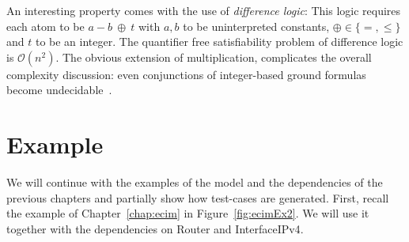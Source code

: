An interesting property comes with the use of \emph{difference logic}: This logic requires each atom to be $a - b\ \oplus\ t$ with $a,b$ to be uninterpreted constants, $\oplus \in \{ =, \leq\}$ and $t$ to be an integer. The quantifier free satisfiability problem of difference logic is $\mathcal{O}(n^2)$. The obvious extension of multiplication, complicates the overall complexity discussion: even conjunctions of integer-based ground formulas become undecidable~\cite{smt-book}.

\section{Example}\label{sec:example}

We will continue with the examples of the model and the dependencies of the previous chapters and partially show how test-cases are generated. First, recall the example of Chapter~\ref{chap:ecim} in Figure~\ref{fig:ecimEx2}. We will use it together with the dependencies on \textsf{Router} and \textsf{InterfaceIPv4}. 

